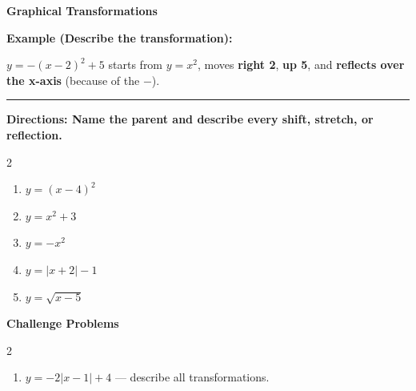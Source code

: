 \documentclass[12pt]{article}
\begin{document}
\vspace{0.35cm}

\begin{center}{\Large \textbf{Graphical Transformations}}\end{center}\vspace{0.25cm}
\textbf{Example (Describe the transformation):}

$y=-(x-2)^{2}+5$ starts from $y=x^{2}$, moves \textbf{right 2}, \textbf{up 5}, and \textbf{reflects over the x-axis} (because of the $-$).

\vspace{0.3cm}\hrule\vspace{0.4cm}
\textbf{Directions: Name the parent and describe every shift, stretch, or reflection.}

\begin{multicols}{2}
\begin{enumerate}[label=\textbf{\arabic*.}, start=1, itemsep=2cm]
  \item $\displaystyle y=(x-4)^{2}$
  \item $\displaystyle y=x^{2}+3$
  \item $\displaystyle y=-x^{2}$
  \item $\displaystyle y=|x+2|-1$
  \item $\displaystyle y=\sqrt{x-5}$
\end{enumerate}
\end{multicols}
\newpage

\begin{center}{\large \textbf{Challenge Problems}}\end{center}\vspace{0.3cm}
\begin{multicols}{2}\begin{enumerate}[label=\textbf{\arabic*.}, start=6, itemsep=2.6cm]
  \item $y=-2|x-1|+4$ — describe all transformations.
\end{enumerate}\end{multicols}\newpage
\end{document}
